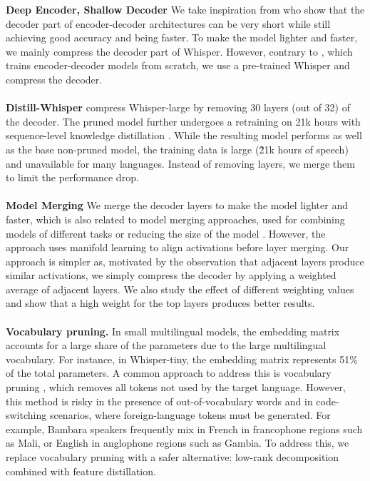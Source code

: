 \documentclass{article}
\newcommand{\myparagraph}[1]{\noindent\textbf{#1}}
\begin{document}
\myparagraph{Deep Encoder, Shallow Decoder} We take inspiration from \cite{kasai2021deepencodershallowdecoder} who show that the decoder part of encoder-decoder architectures can be very short while still achieving good accuracy and being faster. To make the model lighter and faster, we mainly compress the decoder part of Whisper. However, contrary to \cite{kasai2021deepencodershallowdecoder}, which trains encoder-decoder models from scratch, we use a pre-trained Whisper and compress the decoder.\\
\\
\myparagraph{Distill-Whisper} \cite{distill-whisper} compress Whisper-large by removing 30 layers (out of 32) of the decoder. The pruned model further undergoes a retraining on 21k hours with sequence-level knowledge distillation \cite{kim2016sequencelevelknowledgedistillation}. While the resulting model performs as well as the base non-pruned model, the training data is large (\~21k hours of speech) and unavailable for many languages. Instead of removing layers, we merge them to limit the performance drop.
\\
\\
\myparagraph{Model Merging} We merge the decoder layers to make the model lighter and faster, which is also related to model merging approaches, used for combining models of different tasks \cite{wortsman2022modelsoupsaveragingweights, yadav2023tiesmergingresolvinginterferencemerging} or reducing the size of the model \cite{liu2024pruningmergingcompressingllms}. However, the approach \cite{liu2024pruningmergingcompressingllms} uses manifold learning to align activations before layer merging. Our approach is simpler as, motivated by the observation that adjacent layers produce similar activations, we simply compress the decoder by applying a weighted average of adjacent layers. We also study the effect of different weighting values and show that a high weight for the top layers produces better results.
\\
\\
\myparagraph{Vocabulary pruning.} In small multilingual models, the embedding matrix accounts for a large share of the parameters due to the large multilingual vocabulary. For instance, in Whisper-tiny, the embedding matrix represents 51\% of the total parameters. A common approach to address this is vocabulary pruning \cite{abdaoui-etal-2020-load, vocabprune}, which removes all tokens not used by the target language. However, this method is risky in the presence of out-of-vocabulary words and in code-switching scenarios, where foreign-language tokens must be generated. For example, Bambara speakers frequently mix in French in francophone regions such as Mali, or English in anglophone regions such as Gambia. To address this, we replace vocabulary pruning with a safer alternative: low-rank decomposition combined with feature distillation.
\end{document}
